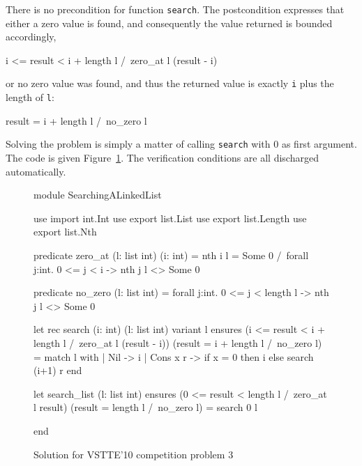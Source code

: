 There is no precondition for function \texttt{search}.
The postcondition expresses that either a zero value is found, and
consequently the value returned is bounded accordingly,
\begin{whycode}
  i <= result < i + length l /\ zero_at l (result - i)
\end{whycode}
or no zero value was found, and thus the returned value is exactly
\texttt{i} plus the length of \texttt{l}:
\begin{whycode}
  result = i + length l /\ no_zero l
\end{whycode}
Solving the problem is simply a matter of calling \texttt{search} with
0 as first argument.
The code is given Figure~\ref{fig:LinkedList}.
The verification conditions are all discharged automatically.
\begin{figure}
  \centering
\begin{whycode}
module SearchingALinkedList

  use import int.Int
  use export list.List
  use export list.Length
  use export list.Nth

  predicate zero_at (l: list int) (i: int) =
    nth i l = Some 0 /\ forall j:int. 0 <= j < i -> nth j l <> Some 0

  predicate no_zero (l: list int) =
    forall j:int. 0 <= j < length l -> nth j l <> Some 0

  let rec search (i: int) (l: list int) variant { l }
    ensures { (i <= result < i + length l /\ zero_at l (result - i))
           \/ (result = i + length l /\ no_zero l) }
  = match l with
    | Nil -> i
    | Cons x r -> if x = 0 then i else search (i+1) r
    end

  let search_list (l: list int)
    ensures { (0 <= result < length l /\ zero_at l result)
           \/ (result = length l /\ no_zero l) }
  = search 0 l

end
\end{whycode}
\vspace*{-1em}%
  \caption{Solution for VSTTE'10 competition problem 3}
  \label{fig:LinkedList}
\end{figure}

